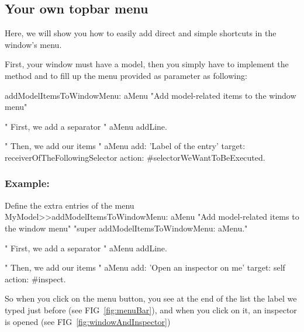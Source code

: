 \documentclass[a4paper,10pt,twoside]{book}
\begin{document}
\subsection{Your own topbar menu}

Here, we will show you how to easily add direct and simple shortcuts in the window's menu.

First, your window must have a model, then you simply have to implement the method  and to fill up the menu provided as parameter as following:

\begin{method}{}

addModelItemsToWindowMenu: aMenu
	"Add model-related items to the window menu"
	
	" First, we add a separator "
	aMenu addLine.
	
	" Then, we add our items "
	aMenu
		add: 'Label of the entry'
		target: receiverOfTheFollowingSelector
		action: #selectorWeWantToBeExecuted.

\end{method} 

\subsubsection{Example:}

\begin{method}{Define the extra entries of the menu}
MyModel>>addModelItemsToWindowMenu: aMenu
	"Add model-related items to the window menu"
	"super addModelItemsToWindowMenu: aMenu."
	
	" First, we add a separator "
	aMenu addLine.
	
	" Then, we add our items "
	aMenu
		add: 'Open an inspector on me'
		target: self
		action: #inspect.
\end{method} 

So when you click on the menu button, you see at the end of the list the label we typed just before (see FIG~\ref{fig:menuBar}), and when you click on it, an inspector is opened (see FIG~\ref{fig:windowAndInspector})
\end{document}
